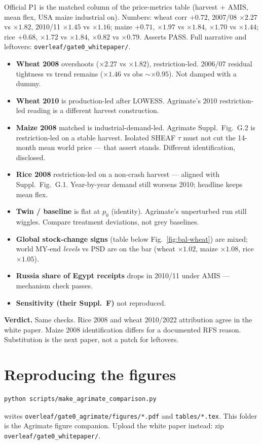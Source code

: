 \documentclass[11pt,a4paper]{article}
\begin{document}
Official P1 is the matched column of the price-metrics table (harvest + AMIS, mean
flex, USA maize industrial on). Numbers: wheat corr $+0.72$, 2007/08
$\times 2.27$ vs $\times 1.82$, 2010/11 $\times 1.45$ vs $\times 1.16$;
maize $+0.71$, $\times 1.97$ vs $\times 1.84$, $\times 1.70$ vs $\times 1.44$;
rice $+0.68$, $\times 1.72$ vs $\times 1.84$, $\times 0.82$ vs $\times 0.79$.
Asserts PASS. Full narrative and leftovers:
\texttt{overleaf/gate0\_whitepaper/}.

\begin{itemize}
  \item \textbf{Wheat 2008} overshoots ($\times 2.27$ vs $\times 1.82$),
        restriction-led. 2006/07 residual tightness vs trend remains
        ($\times 1.46$ vs obs $\sim\times 0.95$). Not damped with a dummy.
  \item \textbf{Wheat 2010} is production-led after LOWESS. Agrimate's 2010
        restriction-led reading is a different harvest construction.
  \item \textbf{Maize 2008} matched is industrial-demand-led. Agrimate
        Suppl.\ Fig.~G.2 is restriction-led on a stable harvest. Isolated
        SHEAF $\tau$ must not cut the 14-month mean world price --- that
        assert stands. Different identification, disclosed.
  \item \textbf{Rice 2008} restriction-led on a non-crash harvest --- aligned
        with Suppl.\ Fig.~G.1. Year-by-year demand still worsens 2010; headline
        keeps mean flex.
  \item \textbf{Twin / baseline} is flat at $p_0$ (identity). Agrimate's
        unperturbed run still wiggles. Compare treatment deviations, not grey
        baselines.
  \item \textbf{Global stock-change signs} (table below Fig.~\ref{fig:bal-wheat})
        are mixed; world MY-end \emph{levels} vs PSD are on the bar
        (wheat $\times 1.02$, maize $\times 1.08$, rice $\times 1.05$).
  \item \textbf{Russia share of Egypt receipts} drops in 2010/11 under AMIS
        --- mechanism check passes.
  \item \textbf{Sensitivity (their Suppl.~F)} not reproduced.
\end{itemize}

\textbf{Verdict.} Same checks. Rice 2008 and wheat 2010/2022 attribution agree
in the white paper. Maize 2008 identification differs for a documented RFS
reason. Substitution is the next paper, not a patch for leftovers.

\section{Reproducing the figures}

\begin{verbatim}
python scripts/make_agrimate_comparison.py
\end{verbatim}
writes \texttt{overleaf/gate0\_agrimate/figures/*.pdf} and
\texttt{tables/*.tex}. This folder is the Agrimate figure companion.
Upload the white paper instead: zip \texttt{overleaf/gate0\_whitepaper/}.
\end{document}

